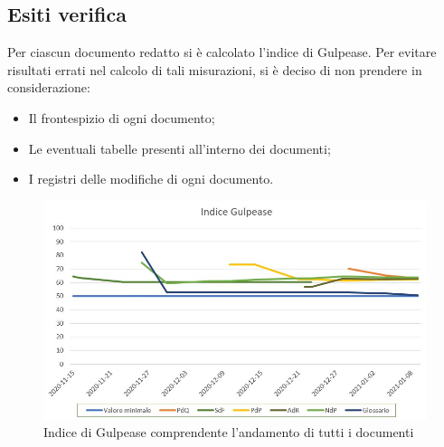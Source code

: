 \subsection{Esiti verifica}
Per ciascun documento redatto si è calcolato l'indice di Gulpease. Per evitare risultati errati nel calcolo di tali misurazioni, si è deciso di non prendere in considerazione:
\begin{itemize}
	\item Il frontespizio di ogni documento;
	\item Le eventuali tabelle presenti all'interno dei documenti;
	\item I registri delle modifiche di ogni documento.
\end{itemize}
\begin{figure}[ht]
	\centering
	\includegraphics[scale=0.6]{Immagini/Gulpease_v1.0.0}
	\caption{Indice di Gulpease comprendente l'andamento di tutti i documenti}
	\label{fig:gulpease}
\end{figure}